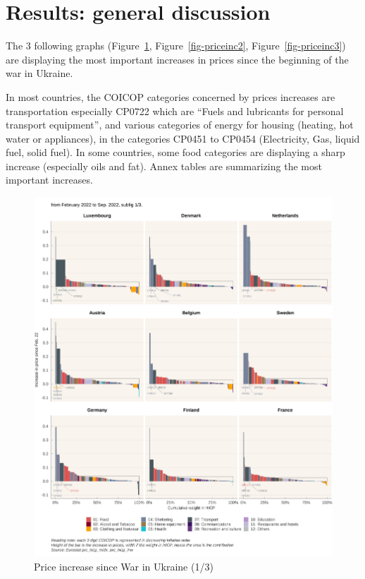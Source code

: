 \documentclass[
  9pt,
  a4paper,
  numbers=noendperiod,
  DIV=12]{scrartcl}
\begin{document}
\hypertarget{results-general-discussion}{%
\section{Results: general discussion}\label{results-general-discussion}}

The 3 following graphs
(Figure~\ref{fig-priceinc1}, Figure~\ref{fig-priceinc2}, Figure~\ref{fig-priceinc3})
are displaying the most important increases in prices since the
beginning of the war in Ukraine.

In most countries, the COICOP categories concerned by prices increases
are transportation especially CP0722 which are ``Fuels and lubricants
for personal transport equipment'', and various categories of energy for
housing (heating, hot water or appliances), in the categories CP0451 to
CP0454 (Electricity, Gas, liquid fuel, solid fuel). In some countries,
some food categories are displaying a sharp increase (especially oils
and fat). Annex tables are summarizing the most important increases.

\begin{figure}[htb]

\caption{\label{fig-priceinc1}Price increase since War in Ukraine (1/3)}

{\centering \includegraphics[width=1\textwidth,height=\textheight]{SIWU_brief_files/figure-pdf/fig-priceinc1-1.png}

}

\end{figure}
\end{document}
